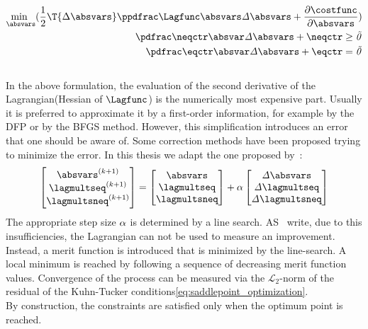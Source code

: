 \documentclass[../main.tex]{subfiles}
\begin{document}
\begin{align}
\underset{\absvars}{\text{min }}( \frac{1}{2} \T{\incrabsvars} \it{\PPLagfuncBYabsvars} \incrabsvars + \frac{\partial \it{\costfunc}}{\partial \absvars} ) \nonumber \\
\it{\PneqctrBYabsvars} \incrabsvars+\it{\neqctr} \geq \vec{0} \nonumber\\
\it{\PeqctrBYabsvars} \incrabsvars+\it{\eqctr} = \vec{0} \label{eq:quadratic_minimization_problem_3}
\end{align}
\\
In the above formulation, the evaluation of the second derivative of the Lagrangian(Hessian of $\Lagfunc$) is the numerically most expensive part. Usually it is preferred to approximate it by a first-order information, for example by the \ac{DFP} or by the \ac{BFGS} method. However, this simplification introduces an error that one should be aware of. Some correction methods have been proposed trying to minimize the error. In this thesis we adapt the one proposed by~\cite{Maute2001}:
\begin{align}\label{eq:correction_step}
\begin{bmatrix}
\absvars^{(k+1)} \\
\lagmultseq^{(k+1)} \\
\lagmultsneq^{(k+1)}
\end{bmatrix} =
  \begin{bmatrix}
  \it{\absvars} \\
  \it{\lagmultseq} \\
  \it{\lagmultsneq} \\
  \end{bmatrix} +
    \it{\alpha}
    \begin{bmatrix}
    \it{\incrabsvars} \\
    \it{\incrlagmultseq} \\
    \it{\incrlagmultsneq} \\
    \end{bmatrix}
\end{align}
The appropriate step size $\it{\alpha}$ is determined by a line search. AS~\cite{Maute2001} write, due to this insufficiencies, the Lagrangian can not be used to measure an improvement. Instead, a merit function is introduced that is minimized by the line-search. A local minimum is reached by following a sequence of decreasing merit function values. Convergence of the process can be measured via the $\mathcal{L}_2$-norm of the residual of the Kuhn-Tucker conditions\eqref{eq:saddlepoint_optimization}.\\
By construction, the constraints are satisfied only when the optimum point is reached.
\end{document}
